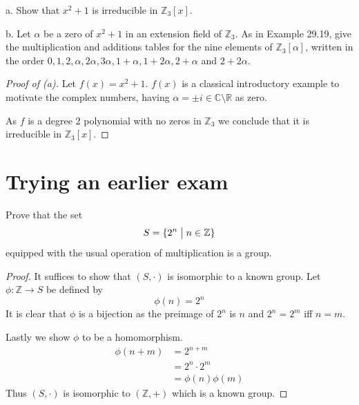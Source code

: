 \begin{prob}
    a. Show that $x^2 + 1$ is irreducible in $\mathbb Z_3[x]$.

    b. Let $\alpha$ be a zero of $x^2 + 1$ in an extension field of 
    $\mathbb Z_3$. As in Example 29.19, give the multiplication and 
    additions tables for the nine elements of $\mathbb Z_3[\alpha]$, 
    written in the order $0,1,2,\alpha,2\alpha,3\alpha, 1 + \alpha, 
    1 + 2\alpha, 2 + \alpha$ and $2 + 2 \alpha$.
\end{prob}
\begin{proof}[Proof of (a)]
    Let $f(x) = x^2 + 1$. $f(x)$ is a classical introductory example 
    to motivate the complex numbers, having 
    $\alpha = \pm i \in \mathbb C\setminus{\mathbb R}$ as zero.  

    As $f$ is a degree $2$ polynomial with no zeros in $\mathbb Z_3$ 
    we conclude that it is irreducible in $\mathbb Z_3[x]$.
\end{proof}

\newpage 
\section{Trying an earlier exam}
\begin{prob}
    Prove that the set 
    \[
        S = \{2^n \bigm| n \in \mathbb Z\}
    \]
    equipped with the usual operation of multiplication is a group.
\end{prob}
\begin{proof}
    It suffices to show that $(S,\cdot)$ is isomorphic to a known 
    group. Let $\phi : \mathbb Z \to S$ be defined by 
    \[
        \phi(n) = 2^n
    \]
    It is clear that $\phi$ is a bijection as the preimage of 
    $2^n$ is $n$ and $2^n = 2^m$ iff $n = m$. 

    Lastly we show $\phi$ to be a homomorphism. 
    \begin{align*}
        \phi(n+m) &= 2^{n+m} \\ 
                  &= 2^n \cdot 2^m \\ 
                  &= \phi(n)\phi(m)
    \end{align*}
    Thus $(S,\cdot)$ is isomorphic to $(\mathbb Z, +)$ 
    which is a known group.
\end{proof}

